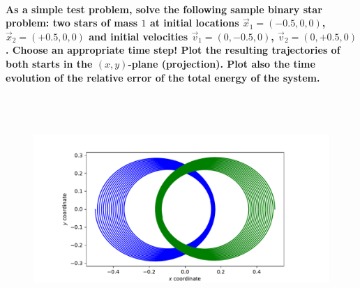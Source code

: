     \paragraph{As a simple test problem, solve the following sample binary 
        star problem: two stars of mass $1$ at initial locations 
        $\vec x_1=(-0.5,0,0)$, $\vec x_2=(+0.5,0,0)$ and initial velocities
        $\vec v_1=(0,-0.5,0)$, $\vec v_2=(0,+0.5,0)$. Choose an appropriate
        time step! Plot the resulting trajectories of both starts in the 
        $(x,y)$-plane (projection). Plot also the time evolution of the 
        relative error of the total energy of the system.
    } \ \\
        \\
        \begin{figure}[h!]
            \centering
            \includegraphics[width=\textwidth]{./figures/task2_2body.pdf}
            \caption{}
        \end{figure} \ \\ 
    
    \newpage

